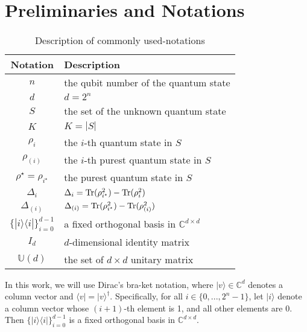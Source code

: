 \section{Preliminaries and Notations}
\label{sec: pre and model}

\begin{table}[t]
\caption{Description of commonly used-notations}
\label{table:notations}
\vskip 0.15in
\begin{center}
\begin{small}
\begin{tabular}{c|l}
\hline
Notation & Description \\
\hline
$n$  & the qubit number of the quantum state\\
\hline
$d$  & $d =2^n$ \\
\hline
$S$ & the set of the unknown quantum state \\
\hline
$K$ & $K = |S|$\\
\hline
$\rho_i$ & the $i$-th quantum state in $S$ \\
\hline
$\rho_{(i)}$ & the $i$-th purest quantum state in $S$ \\
\hline
$\rho^\star = \rho_{i^\star}$ & the purest quantum state in $S$ \\
\hline
$\Delta_i$ & $\Delta_i =\mathrm{Tr}(\rho_{i^\star}^2) - \mathrm{Tr}(\rho^2_{i})$\\
\hline
$\Delta_{(i)}$ & $\Delta_{(i)} =\mathrm{Tr}(\rho_{i^\star}^2) - \mathrm{Tr}(\rho^2_{(i)})$ \\
\hline
$\{|i \rangle\langle i|\}^{d-1}_{i=0}$ & a fixed orthogonal basis in $\mathbb{C}^{d \times d}$\\
\hline
$I_d$ & $d$-dimensional identity matrix \\
\hline
$\mathbb{U}(d)$ & the set of $d \times d$ unitary matrix\\
\hline
\end{tabular}
\end{small}
\end{center}
\vskip -0.1in
\end{table}

In this work, we will use Dirac's bra-ket notation, where $| v \rangle \in \mathbb{C}^d$ denotes a column vector and $\langle v| = | v \rangle^\dagger$. 
Specifically, for all $ i \in \{0,...,2^n-1\}$, let $| i \rangle$ denote a column vector whose $(i+1)$-th element is 1, and all other elements are 0. 
Then $\{|i\rangle \langle i | \}_{i=0}^{d-1}$ is a fixed orthogonal basis in $\mathbb{C}^{d \times d}$.

